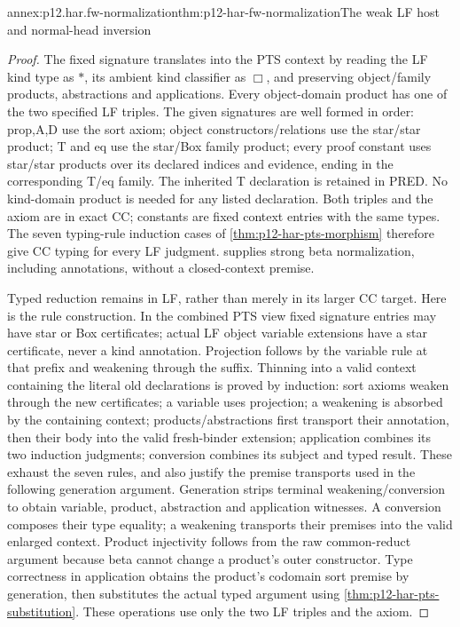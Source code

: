 \begin{annexitem}{annex:p12.har.fw-normalization}{thm:p12-har-fw-normalization}{The weak LF host and normal-head inversion}
\begin{proof}
The fixed signature translates into the PTS context by reading the LF
kind type as \(\ast\), its ambient kind classifier as \(\Box\),
and preserving object/family products, abstractions and applications.
Every object-domain product has one of the two specified LF triples.
The given signatures are well formed in order: prop,A,D use the sort
axiom; object constructors/relations use the star/star product;
T and eq use the star/Box family product; every proof constant uses
star/star products over its declared indices and evidence, ending in
the corresponding T/eq family. The inherited T declaration is retained
in PRED. No kind-domain product is needed for any listed declaration.
Both triples and the axiom are in exact CC; constants are fixed context
entries with the same types. The seven typing-rule induction cases of
\cref{thm:p12-har-pts-morphism} therefore give CC typing for every
LF judgment.  supplies strong beta
normalization, including annotations, without a closed-context premise.

Typed reduction remains in LF, rather than merely in its larger CC
target. Here is the rule construction. In the combined PTS view fixed
signature entries may have star or Box certificates; actual LF object
variable extensions have a star certificate, never a kind annotation.
Projection follows by the
variable rule at that prefix and weakening through the suffix. Thinning
into a valid context containing the literal old declarations is proved
by induction: sort axioms weaken through the new certificates; a variable
uses projection; a weakening is absorbed by the containing context;
products/abstractions first transport their annotation, then their body
into the valid fresh-binder extension; application combines its two
induction judgments; conversion combines its subject and typed result.
These exhaust the seven rules, and also justify the premise transports
used in the following generation argument. Generation strips terminal
weakening/conversion to obtain variable, product, abstraction and
application witnesses. A conversion composes their type equality; a
weakening transports their premises into the valid enlarged context.
Product injectivity follows from the raw common-reduct argument because
beta cannot change a product's outer constructor. Type correctness in
application obtains the product's codomain sort premise by generation,
then substitutes the actual typed argument using
\cref{thm:p12-har-pts-substitution}. These operations use only the
two LF triples and the axiom.


\end{proof}
\end{annexitem}
